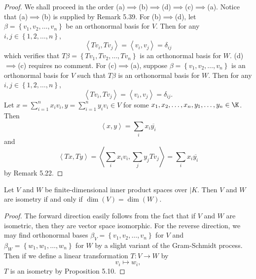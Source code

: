 \documentclass[linearalgebraII]{subfiles}
\begin{document}
    \begin{proof}
        We shall proceed in the order (a)$\implies$(b)$\implies$(d)$\implies$(c)$\implies$(a). Notice that (a)$\implies$(b) is supplied by Remark 5.39. For (b)$\implies$(d), let $\beta=\left\lbrace v_1,v_2,\ldots,v_n \right\rbrace$ be an orthonormal basis for $V$. Then for any $i,j\in\left\lbrace 1,2,\ldots,n \right\rbrace$,
        \begin{equation*}
            \left\langle Tv_i, Tv_j\right\rangle = \left\langle v_i, v_j\right\rangle = \delta_{ij}
        \end{equation*}
        which verifies that $T\beta = \left\lbrace Tv_1,Tv_2,\ldots,Tv_n \right\rbrace$ is an orthonormal basis for $W$. (d)$\implies$(c) requires no comment. For (c)$\implies$(a), suppose $\beta = \left\lbrace v_1,v_2,\ldots,v_n \right\rbrace$ is an orthonormal basis for $V$ such that $T\beta$ is an orthonormal basis for $W$. Then for any $i,j\in\left\lbrace 1,2,\ldots,n \right\rbrace$,
        \begin{equation*}
            \left\langle Tv_i, Tv_j\right\rangle = \left\langle v_i, v_j\right\rangle = \delta_{ij}.
        \end{equation*}
        Let $x=\sum^{n}_{i=1} x_iv_i, y=\sum^{n}_{i=1} y_iv_i\in V$ for some $x_1,x_2,\ldots,x_n,y_1,\ldots,y_n\in\K$. Then
        \begin{equation*}
            \left\langle x, y\right\rangle = \sum^{}_{i} x_i\overline{y_i} 
        \end{equation*}
        and
        \begin{equation*}
            \left\langle Tx, Ty\right\rangle = \left\langle \sum^{}_{i} x_iv_i, \sum^{}_{j} y_jTv_j\right\rangle = \sum^{}_{i} x_i\overline{y_i} 
        \end{equation*}
        by Remark 5.22.
    \end{proof}

    \begin{cor}{}
        Let $V$ and $W$ be finite-dimensional inner product spaces over $|K$. Then $V$ and $W$ are isometry if and only if $\dim(V) = \dim(W)$.
    \end{cor}	

    \begin{proof}
        The forward direction easily follows from the fact that if $V$ and $W$ are isometric, then they are vector space isomorphic. For the reverse direction, we may find orthonormal bases $\beta_V = \left\lbrace v_1,v_2,\ldots,v_n \right\rbrace$ for $V$ and $\beta_W = \left\lbrace w_1,w_1,\ldots,w_n \right\rbrace$ for $W$ by a slight variant of the Gram-Schmidt process. Then if we define a linear transformation $T:V\to W$ by
        \begin{equation*}
            v_i\mapsto w_i,
        \end{equation*}
        $T$ is an isometry by Proposition 5.10.
    \end{proof}
\end{document}
